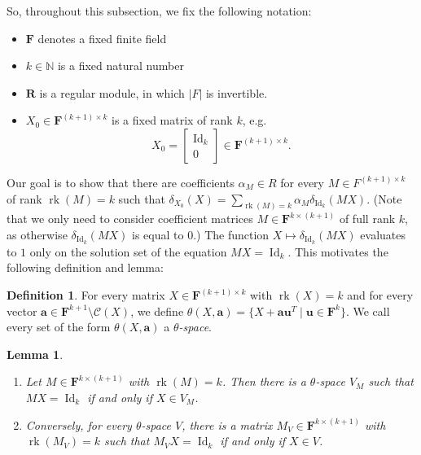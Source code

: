 \documentclass[11pt]{amsart}
\theoremstyle{plain}
\newtheorem{lemma}[thm]{Lemma}
\theoremstyle{definition}
\newtheorem{definition}[thm]{Definition}
\newcommand{\N}{{\mathbb N}}
\newcommand{\F}{{\mathbf F}}
\newcommand{\alg}[1]{\mathbf{#1}}
\newcommand{\clonoid}[1]{\mathcal{#1}}
\newcommand{\clodO}{\clonoid{O}}
\newcommand{\algB}{\alg{B}}
\newcommand{\algR}{\alg{R}}
\renewcommand\vec{\mathbf}
\newcommand{\va}{\vec{a}}
\newcommand{\vu}{\vec{u}}
\DeclareMathOperator{\rk}{rk}
\DeclareMathOperator{\Id}{Id}
\newcommand{\Col}[1]{\mathcal{C}(#1)}
\begin{document}

So, throughout this subsection, we fix the following notation:
\begin{itemize}
    \item $\F$ denotes a fixed finite field
    \item $k \in \N$ is a fixed natural number
    \item $\algR$ is a regular module, in which $|F|$ is invertible.
    \item $X_0\in \F^{(k+1)\times k}$ is a fixed matrix of rank $k$, e.g.
    $$X_0 = \begin{bmatrix} \Id_k\\ 0
 \end{bmatrix} \in \F^{(k+1)\times k}.$$
\end{itemize}


Our goal is to show that there are coefficients $\alpha_M \in R$ for every $M \in F^{(k+1)\times k}$ of rank $\rk(M) = k$ such that $\delta_{X_0}(X) = \sum_{\rk(M) = k} \alpha_M \delta_{\Id_k}(MX)$. (Note that we only need to consider coefficient matrices $M \in \F^{k \times (k+1)}$ of full rank $k$, as otherwise $\delta_{\Id_k}(MX)$ is equal to $0$.) The function $X \mapsto \delta_{\Id_k}(MX)$ evaluates to $1$ only on the solution set of the equation $MX = \Id_k$. This motivates the following definition and lemma:

\begin{definition}
For every matrix $X \in \F^{(k+1) \times k}$ with $\rk(X) = k$ and for every vector $\va \in \F^{k+1} \setminus \Col{X}$, we define $\theta(X,\va) = \{ X + \va \vu^T \mid \vu \in \F^k \}$. We call every set of the form $\theta(X,\va)$ a \emph{$\theta$-space}.
\end{definition}

\begin{lemma} \label{lemma:thetaspaces} 
\begin{enumerate}
\item\label{ite:lemma:thetaspaces1} Let $M \in \F^{k\times (k+1)}$ with $\rk(M) = k$. Then there is a $\theta$-space $ V_M$ such that $MX = \Id_k$ if and only if $X \in V_M$. 
\item\label{ite:lemma:thetaspaces2} Conversely, for every $\theta$-space $V$, there is a matrix $M_V \in \F^{k\times (k+1)}$ with $\rk(M_V) = k$ such that $M_V X = \Id_k$ if and only if $X \in V$.
\end{enumerate}
\end{lemma}
\end{document}
